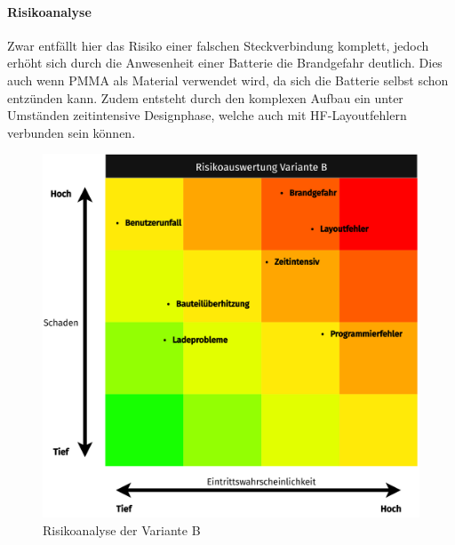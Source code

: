 \paragraph{Risikoanalyse}
Zwar entfällt hier das Risiko einer falschen Steckverbindung komplett, jedoch erhöht sich durch die Anwesenheit einer Batterie die Brandgefahr deutlich. Dies auch wenn PMMA als Material verwendet wird, da sich die Batterie selbst schon entzünden kann. Zudem entsteht durch den komplexen Aufbau ein unter Umständen zeitintensive Designphase, welche auch mit HF-Layoutfehlern verbunden sein können.
\begin{figure}[h]
	\vspace{1cm}
	\centering
	\includegraphics[width=\textwidth*4/5]{pictures/risks-Variante B_ Portabel und Drahtlos.drawio.png}
	\caption{Risikoanalyse der Variante B}
\end{figure}
\newpage
